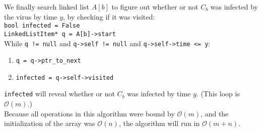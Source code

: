 \documentclass[12pt, letterpaper]{article}
\begin{document}
We finally search linked list $A[b]$ to figure out whether or not $C_b$ was infected by the virus by time $y$, by checking if it was visited:\\
\verb|bool infected = False|\\
\verb|LinkedListItem* q = A[b]->start|\\
While \verb|q != null| and \verb|q->self != null| and \verb|q->self->time <= y|:
\begin{enumerate}
    \item \verb|q = q->ptr_to_next|
    \item \verb|infected = q->self->visited|
\end{enumerate}
\verb|infected| will reveal whether or not $C_b$ was infected by time $y$. (This loop is $\mathcal{O}(m)$.)\\
Because all operations in this algorithm were bound by $\mathcal{O}(m)$, and the initialization of the array was $\mathcal{O}(n)$, the algorithm will run in $\mathcal{O}(m + n)$.
\end{document}
